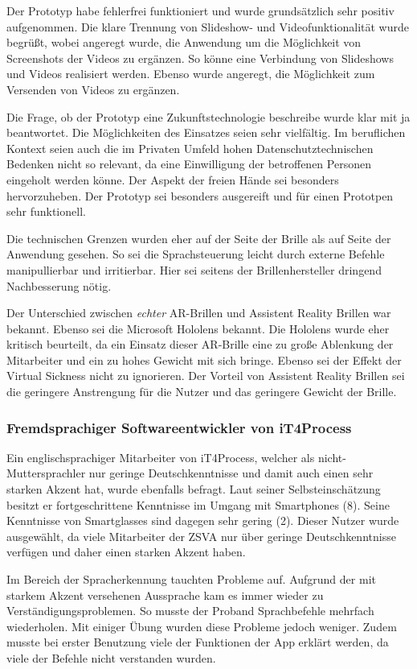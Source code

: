 Der Prototyp habe fehlerfrei funktioniert und wurde grundsätzlich sehr positiv aufgenommen. Die klare Trennung von Slideshow- und Videofunktionalität wurde begrüßt, wobei angeregt wurde, die Anwendung um die Möglichkeit von Screenshots der Videos zu ergänzen. So könne eine Verbindung von Slideshows und Videos realisiert werden. Ebenso wurde angeregt, die Möglichkeit zum Versenden von Videos zu ergänzen.

Die Frage, ob der Prototyp eine Zukunftstechnologie beschreibe wurde klar mit ja beantwortet. Die Möglichkeiten des Einsatzes seien sehr vielfältig. Im beruflichen Kontext seien auch die im Privaten Umfeld hohen Datenschutztechnischen Bedenken nicht so relevant, da eine Einwilligung der betroffenen Personen eingeholt werden könne. Der Aspekt der freien Hände sei besonders hervorzuheben. Der Prototyp sei besonders ausgereift und für einen Prototpen sehr funktionell.

Die technischen Grenzen wurden eher auf der Seite der Brille als auf Seite der Anwendung gesehen. So sei die Sprachsteuerung leicht durch externe Befehle manipullierbar und irritierbar. Hier sei seitens der Brillenhersteller dringend Nachbesserung nötig. 

Der Unterschied zwischen \emph{echter} AR-Brillen und Assistent Reality Brillen war bekannt. Ebenso sei die Microsoft Hololens bekannt. Die Hololens wurde eher kritisch beurteilt, da ein Einsatz dieser AR-Brille eine zu große Ablenkung der Mitarbeiter und ein zu hohes Gewicht mit sich bringe. Ebenso sei der Effekt der Virtual Sickness nicht zu ignorieren. Der Vorteil von Assistent Reality Brillen sei die geringere Anstrengung für die Nutzer und das geringere Gewicht der Brille.
%
%
\subsubsection{Fremdsprachiger Softwareentwickler von iT4Process}
%
Ein englischsprachiger Mitarbeiter von iT4Process, welcher als nicht-Muttersprachler nur geringe Deutschkenntnisse und damit auch einen sehr starken Akzent hat, wurde ebenfalls befragt. Laut seiner Selbsteinschätzung besitzt er fortgeschrittene Kenntnisse im Umgang mit Smartphones (8). Seine Kenntnisse von Smartglasses sind dagegen sehr gering (2). Dieser Nutzer wurde ausgewählt, da viele Mitarbeiter der ZSVA nur über geringe Deutschkenntnisse verfügen und daher einen starken Akzent haben.

Im Bereich der Spracherkennung tauchten Probleme auf. Aufgrund der mit starkem Akzent versehenen Aussprache kam es immer wieder zu Verständigungsproblemen. So musste der Proband Sprachbefehle mehrfach wiederholen. Mit einiger Übung wurden diese Probleme jedoch weniger. Zudem musste bei erster Benutzung viele der Funktionen der App erklärt werden, da viele der Befehle nicht verstanden wurden.

